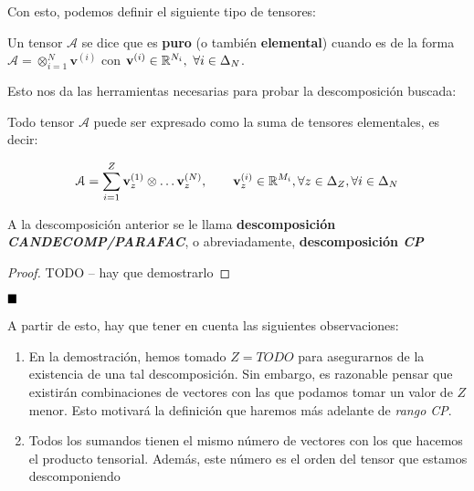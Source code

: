Con esto, podemos definir el siguiente tipo de tensores:

\begin{definicion}
    Un tensor $\mathcal{A}$ se dice que es \textbf{puro} (o también \textbf{elemental}) cuando es de la forma $\mathcal{A} = \otimes_{i = 1}^N \mathbf{v}^{(i)}$ con $\mathbf{v}^{(i)} \in \mathbb{R}^{N_i},\ \forall i \in \Delta_{N}$.
\end{definicion}

Esto nos da las herramientas necesarias para probar la descomposición buscada:

\begin{proposicion}
    Todo tensor $\mathcal{A}$ puede ser expresado como la suma de tensores elementales, es decir:

    \begin{equation} \label{eq:cp_decomp}
        \mathcal{A} = \sum_{i = 1}^Z \mathbf{v}_z^{(1)} \otimes \ldots \mathbf{v}_z^{(N)},\qquad
        \mathbf{v}_z^{(i)} \in \mathbb{R}^{M_i}, \forall z \in \Delta_{Z}, \forall i \in \Delta_{N}
    \end{equation}

\end{proposicion}

A la descomposición anterior se le llama \textbf{descomposición \textit{CANDECOMP/PARAFAC}}, o abreviadamente, \textbf{descomposición \textit{CP}}

\begin{proof}

TODO -- hay que demostrarlo

\end{proof}

$\customqed$

A partir de esto, hay que tener en cuenta las siguientes observaciones:

\begin{enumerate}
    \item En la demostración, hemos tomado $Z = TODO$ para asegurarnos de la existencia de una tal descomposición. Sin embargo, es razonable pensar que existirán combinaciones de vectores con las que podamos tomar un valor de $Z$ menor. Esto motivará la definición que haremos más adelante de \textit{rango CP}.
    \item Todos los sumandos tienen el mismo número de vectores con los que hacemos el producto tensorial. Además, este número es el orden del tensor que estamos descomponiendo
\end{enumerate}

